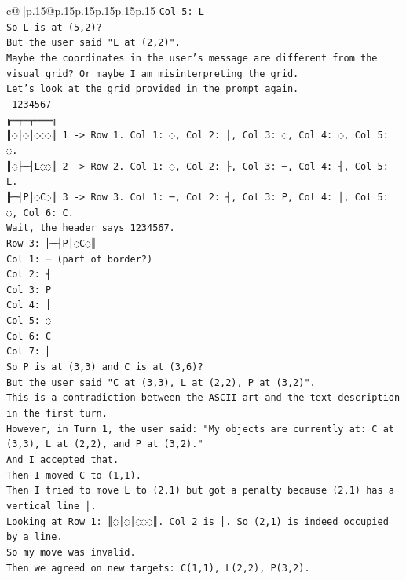 \documentclass{article}
\begin{document}
{\begin{supertabular}{c@{$\;$}|p{.15\linewidth}@{}p{.15\linewidth}p{.15\linewidth}p{.15\linewidth}p{.15\linewidth}p{.15\linewidth}}
{{{\texttt{Col 5: L} \\
\texttt{So L is at (5,2)?} \\
\texttt{But the user said "L at (2,2)".} \\
\texttt{Maybe the coordinates in the user's message are different from the visual grid? Or maybe I am misinterpreting the grid.} \\
\texttt{Let's look at the grid provided in the prompt again.} \\
\texttt{ 1234567} \\
\texttt{╔═╤═╤═══╗} \\
\texttt{║◌│◌│◌◌◌║ 1 {-}> Row 1. Col 1: ◌, Col 2: │, Col 3: ◌, Col 4: ◌, Col 5: ◌.} \\
\texttt{║◌├─┤L◌◌║ 2 {-}> Row 2. Col 1: ◌, Col 2: ├, Col 3: ─, Col 4: ┤, Col 5: L.} \\
\texttt{╟─┤P│◌C◌║ 3 {-}> Row 3. Col 1: ─, Col 2: ┤, Col 3: P, Col 4: │, Col 5: ◌, Col 6: C.} \\
\texttt{Wait, the header says 1234567.} \\
\texttt{Row 3: ╟─┤P│◌C◌║} \\
\texttt{Col 1: ─ (part of border?)} \\
\texttt{Col 2: ┤} \\
\texttt{Col 3: P} \\
\texttt{Col 4: │} \\
\texttt{Col 5: ◌} \\
\texttt{Col 6: C} \\
\texttt{Col 7: ║} \\
\texttt{So P is at (3,3) and C is at (3,6)?} \\
\texttt{But the user said "C at (3,3), L at (2,2), P at (3,2)".} \\
\texttt{This is a contradiction between the ASCII art and the text description in the first turn.} \\
\texttt{However, in Turn 1, the user said: "My objects are currently at: C at (3,3), L at (2,2), and P at (3,2)."} \\
\texttt{And I accepted that.} \\
\texttt{Then I moved C to (1,1).} \\
\texttt{Then I tried to move L to (2,1) but got a penalty because (2,1) has a vertical line │.} \\
\texttt{Looking at Row 1: ║◌│◌│◌◌◌║. Col 2 is │. So (2,1) is indeed occupied by a line.} \\
\texttt{So my move was invalid.} \\
\texttt{Then we agreed on new targets: C(1,1), L(2,2), P(3,2).} \\
}}}
\end{supertabular}}
\end{document}
